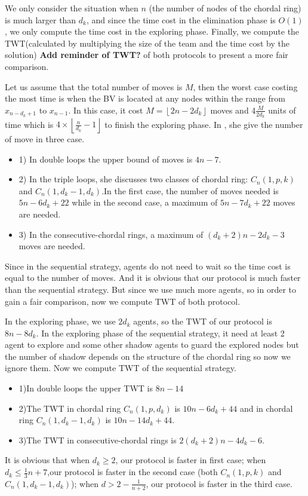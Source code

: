  

 
 

We only consider the situation when $n$ (the number of nodes of the chordal ring) is much larger than $d_k$, and since the time cost in the elimination phase is $O(1)$, we only compute the time cost in the exploring phase. Finally, we compute the TWT(calculated by multiplying the size of the team and the time cost by the solution) {\bf Add reminder of TWT? }of both protocols to present a more fair comparison.

Let us assume that the total number of moves is $M$, then the worst case costing the most time is when the BV is located at any nodes within the range from $x_{n-d_k+1}$ to $x_{n-1}$. In this case, it cost $M=\left \lfloor 2n-2d_k\right \rfloor$ moves and 4$\frac{M}{2d_k}$ units of time which is $4\times \left \lfloor \frac{n}{d_k}-1\right \rfloor$ to finish the exploring phase. 
In \cite{alotaibi}, she give the number of move in three case.
\begin{itemize}
\item 1) In double loops the upper bound of moves is $4n-7$.
\item 2) In the triple loops, she discusses two classes of chordal ring: $C_n(1,p,k)$ and $C_n(1,d_k-1,d_k)$.In the first case, the number of moves needed is $5n-6d_k+22$ while in the second case, a maximum of $5n-7d_k+22$ moves are needed.
\item 3) In the consecutive-chordal rings, a maximum of $(d_k+2)n-2d_k-3$ moves are needed.
\end{itemize}
Since in the sequential strategy, agents do not need to wait so the time cost is equal to the number of moves. And it is obvious that our protocol is much faster than the sequential strategy. But since we use much more agents, so in order to gain a fair comparison, now we compute TWT of both protocol.

In the exploring phase, we use $2d_k$ agents, so the TWT of our protocol is $8n-8d_k$. In the exploring phase of the sequential strategy, it need at least 2 agent to explore and some other shadow agents to guard the explored nodes but the number of shadow depends on the structure of the chordal ring so now we ignore them. Now we compute TWT of the sequential strategy.
\begin{itemize}
\item 1)In double loops the upper TWT is $8n-14$
\item 2)The TWT in chordal ring $C_n(1,p,d_k)$ is $10n-6d_k+44$ and in chordal ring $C_n(1,d_k-1,d_k)$ is $10n-14d_k+44$.
\item 3)The TWT in consecutive-chordal rings is $2(d_k+2)n-4d_k-6$.
\end{itemize}
It is obvious that when $d_k\geq 2$, our protocol is faster in first case; when $d_k\leq \frac{1}{3}n+7$,our protocol is faster in the second case (both $C_n(1,p,k)$ and $C_n(1,d_k-1,d_k)$); when $d>2-\frac{1}{n+2}$, our protocol is faster in the third case.

